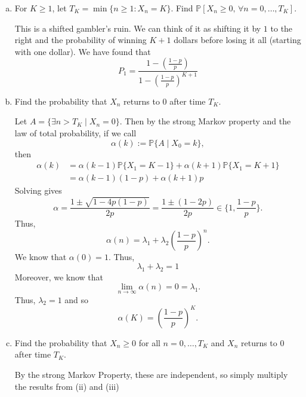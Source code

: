 \documentclass[10pt, oneside]{article}
\newcommand{\bbP}{\mathbb{P}}
\theoremstyle{definition}
\begin{document}
\begin{enumerate}
\begin{enumerate}[(a)]
    \item For \(K\geq 1\), let \(T_K=\min\{n\geq 1:X_n=K\}\). Find \(\mathbb{P}[X_n\geq 0,\,\forall n=0,\ldots,T_K]\).
\begin{solution}
    This is a shifted gambler's ruin. We can think of it as shifting it by $1$ to the right and the probability of winning $K+1$ dollars before losing it all (starting with one dollar). We have found that 
    \[P_1 = \frac{1 - (\frac{1-p}{p})}{1 - (\frac{1-p}{p})^{K+1}}\]
\end{solution}
    
    \item Find the probability that \(X_n\) returns to 0 after time \(T_K\).
\begin{solution}
    Let $A = \{\exists n >T_K \mid X_n = 0\}.$ Then by the strong Markov property and the law of total probability, if we call
    \[\alpha(k):= \bbP\{A \mid X_0 = k\},\] then
\begin{align*}
   \alpha(k) &= \alpha(k-1)\bbP\{X_1 = K-1\} + \alpha(k+1)\bbP\{X_1 = K+1\}\\
   &= \alpha(k-1)(1-p) + \alpha(k+1)p
\end{align*}
Solving gives 
\[\alpha = \frac{1 \pm \sqrt{1 - 4p(1-p)}}{2p} = \frac{1 \pm (1 - 2p)}{2p} \in \{1, \frac{1-p}{p}\}.\] Thus, 
\[\alpha(n) = \lambda_1 + \lambda_2(\frac{1-p}{p})^n.\] We know that $\alpha(0) = 1.$ Thus, 
\[\lambda_1 + \lambda_2 = 1\] Moreover, we know that 
\[\lim_{n\to \infty}\alpha(n) = 0 = \lambda_1.\] Thus, $\lambda_2 = 1$ and so 
\[\alpha(K) = (\frac{1-p}{p})^K.\]
\end{solution}
    
    \item Find the probability that \(X_n\geq 0\) for all \(n=0,\ldots,T_K\) and \(X_n\) returns to 0 after time \(T_K\).
\begin{solution}
    By the strong Markov Property, these are independent, so simply multiply the results from (ii) and (iii)
\end{solution}
\end{enumerate}


\end{enumerate}
\end{document}
